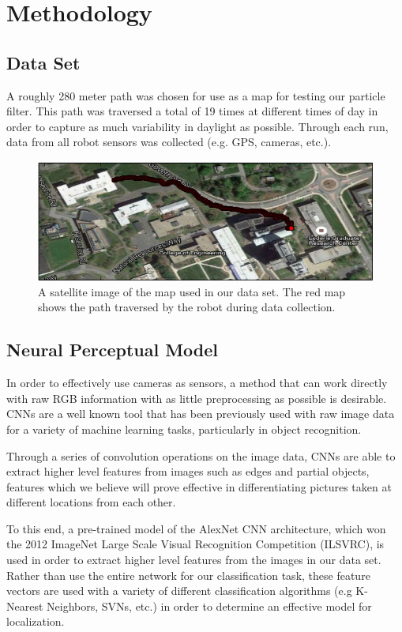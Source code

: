 \documentclass[letterpaper, 10 pt, conference]{ieeeconf}  %
\begin{document}
\section{Methodology}

\subsection{Data Set}
A roughly 280 meter path was chosen for use as a map for testing our particle filter. This path was traversed a total of 19 times at different times of day in order to capture as much variability in daylight as possible. Through each run, data from all robot sensors was collected (e.g. GPS, cameras, etc.).  

\begin{figure}[h]
\centering
\includegraphics[scale=0.5]{map}
\caption{A satellite image of the map used in our data set. The red map shows the path traversed by the robot during data collection.}
\end{figure}

\subsection{Neural Perceptual Model}
In order to effectively use cameras as sensors, a method that can work directly with raw RGB information with as little preprocessing as possible is desirable. CNNs are a well known tool that has been previously used with raw image data for a variety of machine learning tasks, particularly in object recognition. 
\par
Through a series of convolution operations on the image data, CNNs are able to extract higher level features from images such as edges and partial objects, features which we believe will prove effective in differentiating pictures taken at different locations from each other. 
\par
To this end, a pre-trained model of the AlexNet CNN architecture, which won the 2012 ImageNet Large Scale Visual Recognition Competition (ILSVRC), is used in order to extract higher level features from the images in our data set. Rather than use the entire network for our classification task, these feature vectors are used with a variety of different classification algorithms (e.g K-Nearest Neighbors, SVNs, etc.) in order to determine an effective model for localization.  
\end{document}
